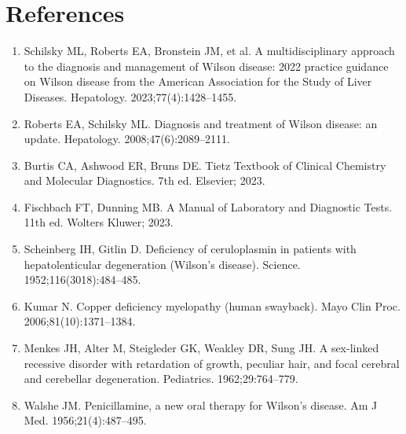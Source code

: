 \section*{References}
\begin{enumerate}
  \item Schilsky ML, Roberts EA, Bronstein JM, et al. A multidisciplinary approach to the diagnosis and management of Wilson disease: 2022 practice guidance on Wilson disease from the American Association for the Study of Liver Diseases. Hepatology. 2023;77(4):1428--1455.
  \item Roberts EA, Schilsky ML. Diagnosis and treatment of Wilson disease: an update. Hepatology. 2008;47(6):2089--2111.
  \item Burtis CA, Ashwood ER, Bruns DE. Tietz Textbook of Clinical Chemistry and Molecular Diagnostics. 7th ed. Elsevier; 2023.
  \item Fischbach FT, Dunning MB. A Manual of Laboratory and Diagnostic Tests. 11th ed. Wolters Kluwer; 2023.
  \item Scheinberg IH, Gitlin D. Deficiency of ceruloplasmin in patients with hepatolenticular degeneration (Wilson's disease). Science. 1952;116(3018):484--485.
  \item Kumar N. Copper deficiency myelopathy (human swayback). Mayo Clin Proc. 2006;81(10):1371--1384.
  \item Menkes JH, Alter M, Steigleder GK, Weakley DR, Sung JH. A sex-linked recessive disorder with retardation of growth, peculiar hair, and focal cerebral and cerebellar degeneration. Pediatrics. 1962;29:764--779.
  \item Walshe JM. Penicillamine, a new oral therapy for Wilson's disease. Am J Med. 1956;21(4):487--495.
\end{enumerate}

\clearpage
